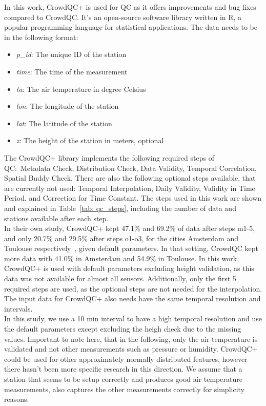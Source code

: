 In this work, CrowdQC+ is used for QC as it offers improvements and bug fixes compared to CrowdQC. It's an open-source software library written in R, a popular programming language for statistical applications. The data needs to be in the following format:

\begin{itemize}
    \item \textit{p\_id}: The unique ID of the station
    \item \textit{time}: The time of the measurement
    \item \textit{ta}: The air temperature in degree Celsius
    \item \textit{lon}: The longitude of the station
    \item \textit{lat}: The latitude of the station
    \item \textit{z}: The height of the station in meters, optional
\end{itemize}

The CrowdQC+ library implements the following required steps of QC:\ Metadata Check, Distribution Check, Data Validity, Temporal Correlation, Spatial Buddy Check. There are also the following optional steps available, that are currently not used: Temporal Interpolation, Daily Validity, Validity in Time Period, and Correction for Time Constant.
The steps used in this work are shown and explained in Table~\ref{tab: qc_steps}, including the number of data and stations available after each step.\\
In their own study, CrowdQC+ kept 47.1\% and 69.2\% of data after steps m1-5, and only 20.7\% and 29.5\% after steps o1-o3, for the cities Amsterdam and Toulouse respectively~\cite{fenner2021crowdqc+}, given default parameters. In that setting, CrowdQC kept more data with 41.0\% in Amsterdam and 54.9\% in Toulouse. In this work, CrowdQC+ is used with default parameters excluding height validation, as this data was not available for almost all sensors. Additionally, only the first 5 required steps are used, as the optional steps are not needed for the interpolation. The input data for CrowdQC+ also needs have the same temporal resolution and intervals.\\
In this study, we use a 10 min interval to have a high temporal resolution and use the default parameters except excluding the heigh check due to the missing values. Important to note here, that in the following, only the air temperature is validated and not other measurements such as pressure or humidity. CrowdQC+ could be used for other approximately normally distributed features, however there hasn't been more specific research in this direction. We assume that a station that seems to be setup correctly and produces good air temperature measurements, also captures the other measurements correctly for simplicity reasons.

